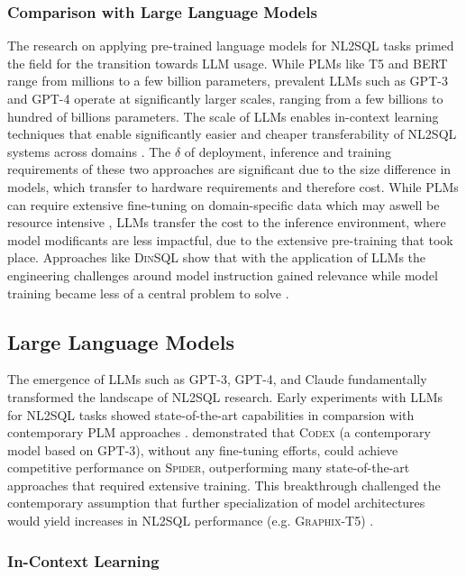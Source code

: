 \documentclass{article}
\begin{document}
\subsubsection{Comparison with Large Language Models}

The research on applying pre-trained language models for NL2SQL tasks primed the field for the transition towards LLM usage. While
PLMs like T5 and BERT range from millions to a few billion parameters, prevalent LLMs such as GPT-3 and GPT-4 operate at
significantly larger scales, ranging from a few billions to hundred of billions parameters. The scale of LLMs enables in-context
learning techniques that enable significantly easier and cheaper transferability of NL2SQL systems across domains \citep{DAIL-SQL}.
The $\delta$ of deployment, inference and training requirements of these two approaches are significant due to the size difference
in models, which transfer to hardware requirements and therefore cost. While PLMs can require extensive fine-tuning on
domain-specific data which may aswell be resource intensive \citep{GRAPHIX, RESDSQL, GRAPPA, STRUG}, LLMs transfer the cost to the 
inference environment, where model modificants are less impactful, due to the extensive pre-training that took place. Approaches 
like \textsc{DinSQL} show that with the application of LLMs the engineering challenges around model instruction gained relevance 
while model training became less of a central problem to solve \citep{DINSQL}.

\subsection{Large Language Models}

The emergence of LLMs such as GPT-3, GPT-4, and Claude fundamentally transformed the landscape of NL2SQL research. Early 
experiments with LLMs for NL2SQL tasks showed state-of-the-art capabilities in comparsion with contemporary PLM approaches 
\citep{DAIL-SQL}. \cite{T2SQL-LLM-Bench-3} demonstrated that \textsc{Codex} (a contemporary model based on GPT-3), without any 
fine-tuning efforts, could achieve competitive performance on \textsc{Spider}, outperforming many state-of-the-art approaches that 
required extensive training. This breakthrough challenged the contemporary assumption that further specialization of model 
architectures would yield increases in NL2SQL performance (e.g. \textsc{Graphix-T5}) \citep{GRAPHIX}.

\subsubsection{In-Context Learning}
\end{document}
